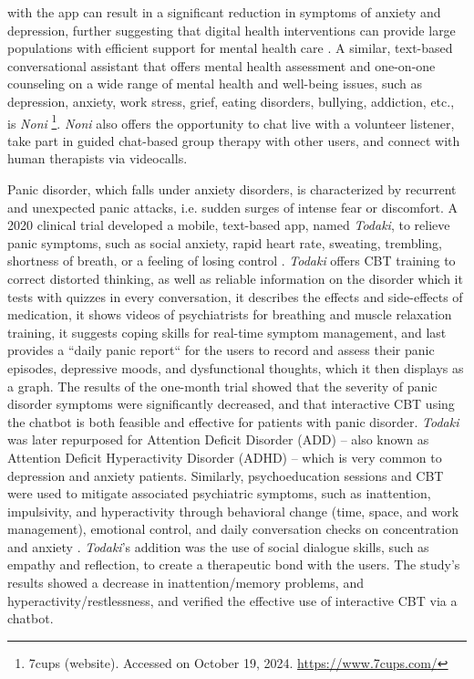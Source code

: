 with the app can result in a significant reduction in symptoms of anxiety and depression, further suggesting that digital health interventions can provide large populations with efficient support for mental health care \cite{wysa2023}. A similar, text-based conversational assistant that offers mental health assessment and one-on-one counseling on a wide range of mental health and well-being issues, such as depression, anxiety, work stress, grief, eating disorders, bullying, addiction, etc., is \textit{Noni} \footnote{7cups (website). Accessed on October 19, 2024. \url{https://www.7cups.com/}}. \textit{Noni} also offers the opportunity to chat live with a volunteer listener, take part in guided chat-based group therapy with other users, and connect with human therapists via videocalls.

Panic disorder, which falls under anxiety disorders, is characterized by recurrent and unexpected panic attacks, i.e. sudden surges of intense fear or discomfort. A 2020 clinical trial developed a mobile, text-based app, named \textit{Todaki}, to relieve panic symptoms, such as social anxiety, rapid heart rate, sweating, trembling, shortness of breath, or a feeling of losing control \cite{panicbot2020}. \textit{Todaki} offers CBT training to correct distorted thinking, as well as reliable information on the disorder which it tests with quizzes in every conversation, it describes the effects and side-effects of medication, it shows videos of psychiatrists for breathing and muscle relaxation training, it suggests coping skills for real-time symptom management, and last provides a ``daily panic report`` for the users to record and assess their panic episodes, depressive moods, and dysfunctional thoughts, which it then displays as a graph. The results of the one-month trial showed that the severity of panic disorder symptoms were significantly decreased, and that interactive CBT using the chatbot is both feasible and effective for patients with panic disorder. \textit{Todaki} was later repurposed for Attention Deficit Disorder (ADD) -- also known as Attention Deficit Hyperactivity Disorder (ADHD) -- which is very common to depression and anxiety patients. Similarly, psychoeducation sessions and CBT were used to mitigate associated psychiatric symptoms, such as inattention, impulsivity, and hyperactivity through behavioral change (time, space, and work management), emotional control, and daily conversation checks on concentration and anxiety \cite{adhd2021}. \textit{Todaki}'s addition was the use of social dialogue skills, such as empathy and reflection, to create a therapeutic bond with the users. The study's results showed a decrease in inattention/memory problems, and hyperactivity/restlessness, and verified the effective use of interactive CBT via a chatbot.

